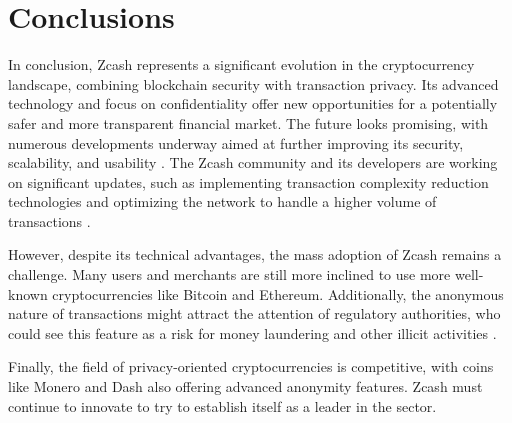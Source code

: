 \section{Conclusions}

In conclusion, Zcash represents a significant evolution in the cryptocurrency landscape, combining blockchain security with transaction privacy. Its advanced technology and focus on confidentiality offer new opportunities for a potentially safer and more transparent financial market.
The future looks promising, with numerous developments underway aimed at further improving its security, scalability, and usability \cite{zcash-future}. The Zcash community and its developers are working on significant updates, such as implementing transaction complexity reduction technologies and optimizing the network to handle a higher volume of transactions \cite{forum}.

\noindent However, despite its technical advantages, the mass adoption of Zcash remains a challenge. Many users and merchants are still more inclined to use more well-known cryptocurrencies like Bitcoin and Ethereum. Additionally, the anonymous nature of transactions might attract the attention of regulatory authorities, who could see this feature as a risk for money laundering and other illicit activities \cite{zcash-privacy}.

\noindent Finally, the field of privacy-oriented cryptocurrencies is competitive, with coins like Monero and Dash also offering advanced anonymity features. Zcash must continue to innovate to try to establish itself as a leader in the sector.